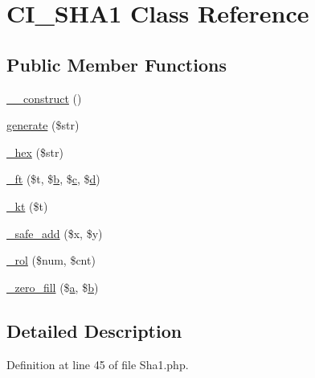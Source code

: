 \hypertarget{class_c_i___s_h_a1}{\section{C\-I\-\_\-\-S\-H\-A1 Class Reference}
\label{class_c_i___s_h_a1}
}
\subsection*{Public Member Functions}
\begin{DoxyCompactItemize}
\item 
\hyperlink{class_c_i___s_h_a1_a095c5d389db211932136b53f25f39685}{\-\_\-\-\_\-construct} ()
\item 
\hyperlink{class_c_i___s_h_a1_ac6b93bee131501c2bd3a134cec2eeb28}{generate} (\$str)
\item 
\hyperlink{class_c_i___s_h_a1_a5fad906bbb8c3531def1b50c256e652e}{\-\_\-hex} (\$str)
\item 
\hyperlink{class_c_i___s_h_a1_aef225b3bbbc79af00dc53b8a4253a6a1}{\-\_\-ft} (\$t, \$\hyperlink{bootstrap_8min_8js_a7c192e47b11481e4717b9f1e04eb4420}{b}, \$\hyperlink{bootstrap_8min_8js_abce695e0af988ece0826d9ad59b8160d}{c}, \$\hyperlink{bootstrap_8min_8js_aeb337d295abaddb5ec3cb34cc2e2bbc9}{d})
\item 
\hyperlink{class_c_i___s_h_a1_a7828b4f54f0ffe2a979a51daf276dff1}{\-\_\-kt} (\$t)
\item 
\hyperlink{class_c_i___s_h_a1_afa61540a9d1b13692ce63c3552c877af}{\-\_\-safe\-\_\-add} (\$x, \$y)
\item 
\hyperlink{class_c_i___s_h_a1_ae1c8bafeb683ecd4cb37fb1c2c65ae4f}{\-\_\-rol} (\$num, \$cnt)
\item 
\hyperlink{class_c_i___s_h_a1_aeef845ba55d1c5cd2613daa43893ec3d}{\-\_\-zero\-\_\-fill} (\$\hyperlink{bootstrap_8min_8js_a7318f59fb86a4437995ee89c780c51ac}{a}, \$\hyperlink{bootstrap_8min_8js_a7c192e47b11481e4717b9f1e04eb4420}{b})
\end{DoxyCompactItemize}


\subsection{Detailed Description}


Definition at line 45 of file Sha1.\-php.



